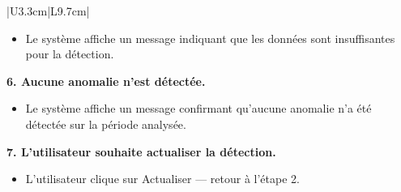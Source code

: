 \documentclass[a4paper,12pt]{report}
\begin{document}
\begin{longtable}{|U{3.3cm}|L{9.7cm}|}
\begin{itemize}
    \item[2.1] Le système affiche un message indiquant que les données sont insuffisantes pour la détection.
\end{itemize}
\textbf{6. Aucune anomalie n'est détectée.}
\begin{itemize}
    \item[6.1] Le système affiche un message confirmant qu'aucune anomalie n'a été détectée sur la période analysée.
\end{itemize}
\textbf{7. L'utilisateur souhaite actualiser la détection.}
\begin{itemize}
    \item[7.1] L'utilisateur clique sur Actualiser --- retour à l'étape 2.
\end{itemize} 
\end{longtable}
\end{document}
